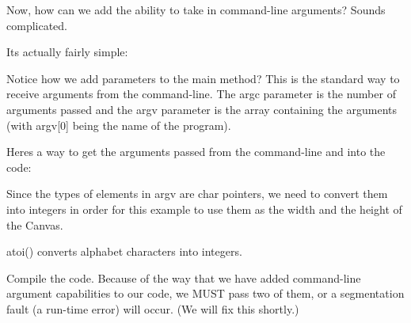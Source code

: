 Now, how can we add the ability to take in command-\/line arguments? Sounds complicated.

Its actually fairly simple\+:


\begin{DoxyCode}{0}
\DoxyCodeLine{\textcolor{preprocessor}{\#include <tsgl.h>}}
\DoxyCodeLine{}
\DoxyCodeLine{\}}
\end{DoxyCode}


Notice how we add parameters to the main method? This is the standard way to receive arguments from the command-\/line. The {\ttfamily argc} parameter is the number of arguments passed and the {\ttfamily argv} parameter is the array containing the arguments (with {\ttfamily argv\mbox{[}0\mbox{]}} being the name of the program).

Here\textquotesingle{}s a way to get the arguments passed from the command-\/line and into the code\+:


\begin{DoxyCode}{0}
\DoxyCodeLine{\textcolor{preprocessor}{\#include <tsgl.h>}}
\DoxyCodeLine{}
\DoxyCodeLine{\}}
\end{DoxyCode}


Since the types of elements in {\ttfamily argv} are char pointers, we need to convert them into integers in order for this example to use them as the width and the height of the Canvas.

{\ttfamily atoi()} converts alphabet characters into integers.

Compile the code. Because of the way that we have added command-\/line argument capabilities to our code, we M\+U\+ST pass two of them, or a segmentation fault (a run-\/time error) will occur. (We will fix this shortly.)

